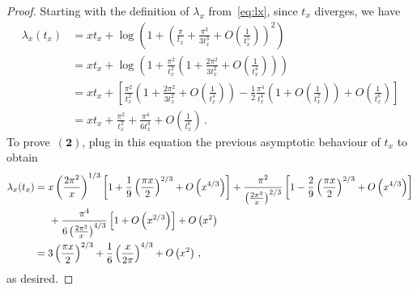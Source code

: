 \documentclass{article}
\newcommand{\1}{\mathbbm{1}}								%
\theoremstyle{definition}
\numberwithin{equation}{section}
\newcommand{\numitem}[1]{$\mathbf{(#1)}$}
\begin{document}
\begin{proof}
    Starting with the definition of $\lambda_x$ from~\eqref{eq:lx}, since $t_x$ diverges, we have
    \begin{align*}
        \lambda_x(t_x)&=xt_x+\log\left(1+\left(\frac{\pi}{t_x}+\frac{\pi^3}{3t_x^3}+O\left(\frac{1}{t_x^5}\right)\right)^2\right)\\
        &=xt_x+\log\left(1+\frac{\pi^2}{t_x^2}\left(1+\frac{2\pi^2}{3t_x^2}+O\left(\frac{1}{t_x^4}\right)\right)\right)\\
        &=xt_x+\left[\frac{\pi^2}{t_x^2}\left(1+\frac{2\pi^2}{3t_x^2}+O\left(\frac{1}{t_x^4}\right)\right)-\frac{1}{2}\frac{\pi^4}{t_x^4}\left(1+O\left(\frac{1}{t_x^2}\right)\right)+O\left(\frac{1}{t_x^6}\right)\right]\\
        &=xt_x+\frac{\pi^2}{t_x^2}+\frac{\pi^4}{6t_x^4}+O\left(\frac{1}{t_x^6}\right)\,.
    \end{align*}
    To prove~\numitem{2}, plug in this equation the previous asymptotic behaviour of $t_x$ to obtain
    \begin{align*}
        \lambda_x(t_x)&=x\left(\frac{2\pi^2}{x}\right)^{1/3}\left[1+\frac{1}{9}\left(\frac{\pi x}{2}\right)^{2/3}+O\left(x^{4/3}\right)\right]+\frac{\pi^2}{\left(\frac{2\pi^2}{x}\right)^{2/3}}\left[1-\frac{2}{9}\left(\frac{\pi x}{2}\right)^{2/3}+O\left(x^{4/3}\right)\right]\\
        &\hspace{0.5cm}+\frac{\pi^4}{6\left(\frac{2\pi^2}{x}\right)^{4/3}}\left[1+O\left(x^{2/3}\right)\right]+O\left(x^2\right)\\
        &=3\left(\frac{\pi x}{2}\right)^{2/3}+\frac{1}{6}\left(\frac{x}{2\pi}\right)^{4/3}+O\left(x^2\right)\,,
    \end{align*}
    as desired.


\end{proof}
\end{document}
